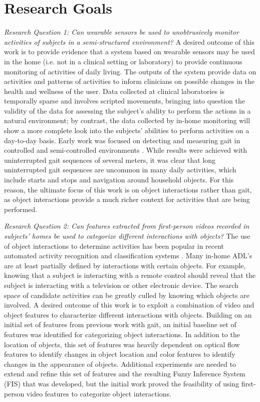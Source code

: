 \documentclass[12pt]{report}
\begin{document}
\section{Research Goals}
\emph{Research Question 1: Can wearable sensors be used to unobtrusively monitor activities of subjects in a semi-structured environment?}
A desired outcome of this work is to provide evidence that a system based on wearable sensors may be used in the home (i.e. not in a clinical setting or laboratory) to provide continuous monitoring of activities of daily living. The outputs of the system provide data on activities and patterns of activities to inform clinicians on possible changes in the health and wellness of the user. Data collected at clinical laboratories is temporally sparse and involves scripted movements, bringing into question the validity of the data for assessing the subject’s ability to perform the actions in a natural environment; by contrast, the data collected by in-home monitoring will show a more complete look into the subjects’ abilities to perform activities on a day-to-day basis.
Early work was focused on detecting and measuring gait in controlled and semi-controlled environments \cite{Schneider2017PreliminaryProcessing, Schneider2019ComparisonEnvironments}. While results were achieved with uninterrupted gait sequences of several meters, it was clear that long uninterrupted gait sequences are uncommon in many daily activities, which include starts and stops and navigation around household objects. For this reason, the ultimate focus of this work is on object interactions rather than gait, as object interactions provide a much richer context for activities that are being performed.

\emph{Research Question 2: Can features extracted from first-person videos recorded in subjects’ homes be used to categorize different interactions with objects?}
The use of object interactions to determine activities has been popular in recent automated activity recognition and classification systems \cite{Pirsiavash2012, Sudhakaran2018, Nakatani2018PreliminaryKnowledge, Wang2018, Gokce2019HumanPairs}. Many in-home ADL’s are at least partially defined by interactions with certain objects. For example, knowing that a subject is interacting with a remote control should reveal that the subject is interacting with a television or other electronic device. The search space of candidate activities can be greatly culled by knowing which objects are involved. A desired outcome of this work is to exploit a combination of video and object features to characterize different interactions with objects.
Building on an initial set of features from previous work with gait, an initial baseline set of features was identified for categorizing object interactions. In addition to the location of objects, this set of features was heavily dependent on optical flow features to identify changes in object location and color features to identify changes in the appearance of objects. Additional experiments are needed to extend and refine this set of features and the resulting Fuzzy Inference System (FIS) that was developed, but the initial work proved the feasibility of using first-person video features to categorize object interactions.
\end{document}

